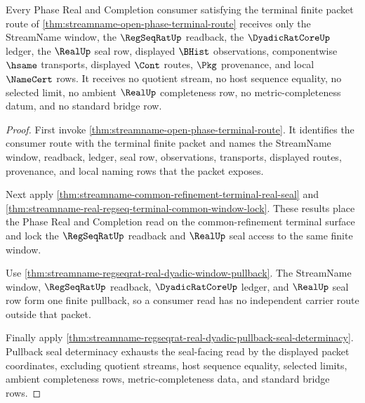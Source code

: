 \begin{theorem}
\label{thm:streamname-open-phase-terminal-nonescape}
Every Phase Real and Completion consumer satisfying the terminal finite packet route of \autoref{thm:streamname-open-phase-terminal-route} receives only the StreamName window, the $\RegSeqRatUp$ readback, the $\DyadicRatCoreUp$ ledger, the $\RealUp$ seal row, displayed $\BHist$ observations, componentwise $\hsame$ transports, displayed $\Cont$ routes, $\Pkg$ provenance, and local $\NameCert$ rows. It receives no quotient stream, no host sequence equality, no selected limit, no ambient $\RealUp$ completeness row, no metric-completeness datum, and no standard bridge row.
\end{theorem}
\begin{proof}
First invoke \autoref{thm:streamname-open-phase-terminal-route}. It identifies the consumer route with the terminal finite packet and names the StreamName window, readback, ledger, seal row, observations, transports, displayed routes, provenance, and local naming rows that the packet exposes.

Next apply \autoref{thm:streamname-common-refinement-terminal-real-seal} and \autoref{thm:streamname-real-regseq-terminal-common-window-lock}. These results place the Phase Real and Completion read on the common-refinement terminal surface and lock the $\RegSeqRatUp$ readback and $\RealUp$ seal access to the same finite window.

Use \autoref{thm:streamname-regseqrat-real-dyadic-window-pullback}. The StreamName window, $\RegSeqRatUp$ readback, $\DyadicRatCoreUp$ ledger, and $\RealUp$ seal row form one finite pullback, so a consumer read has no independent carrier route outside that packet.

Finally apply \autoref{thm:streamname-regseqrat-real-dyadic-pullback-seal-determinacy}. Pullback seal determinacy exhausts the seal-facing read by the displayed packet coordinates, excluding quotient streams, host sequence equality, selected limits, ambient completeness rows, metric-completeness data, and standard bridge rows.
\end{proof}

